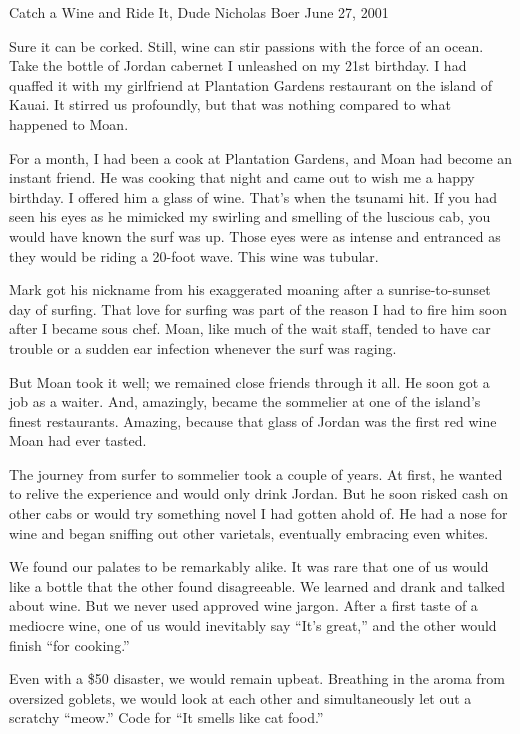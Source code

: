 \documentclass[12pt]{article}
\begin{document}
Catch a Wine and Ride It, Dude\newline
Nicholas Boer\newline
June 27, 2001

\bigskip
Sure it can be corked.
Still, wine can stir passions with the force of an ocean.
Take the bottle of Jordan cabernet I unleashed on my 21st birthday.
I had quaffed it with my girlfriend at Plantation Gardens restaurant on the island of Kauai.
It stirred us profoundly, but that was nothing compared to what happened to Moan.

\bigskip
For a month, I had been a cook at Plantation Gardens, and Moan had become an instant friend.
He was cooking that night and came out to wish me a happy birthday.
I offered him a glass of wine.
That's when the tsunami hit.
If you had seen his eyes as he mimicked my swirling and smelling of the luscious cab, you would have known the surf was up.
Those eyes were as intense and entranced as they would be riding a 20-foot wave.
This wine was tubular.

\bigskip
Mark got his nickname from his exaggerated moaning after a sunrise-to-sunset day of surfing.
That love for surfing was part of the reason I had to fire him soon after I became sous chef.
Moan, like much of the wait staff, tended to have car trouble or a sudden ear infection whenever the surf was raging.

\bigskip
But Moan took it well; we remained close friends through it all.
He soon got a job as a waiter.
And, amazingly, became the sommelier at one of the island's finest restaurants.
Amazing, because that glass of Jordan was the first red wine Moan had ever tasted.

\bigskip
The journey from surfer to sommelier took a couple of years.
At first, he wanted to relive the experience and would only drink Jordan.
But he soon risked cash on other cabs or would try something novel I had gotten ahold of.
He had a nose for wine and began sniffing out other varietals, eventually embracing even whites.

\bigskip
We found our palates to be remarkably alike.
It was rare that one of us would like a bottle that the other found disagreeable.
We learned and drank and talked about wine.
But we never used approved wine jargon.
After a first taste of a mediocre wine, one of us would inevitably say ``It's great,'' and the other would finish ``for cooking.''

\bigskip
Even with a \$50 disaster, we would remain upbeat.
Breathing in the aroma from oversized goblets, we would look at each other and simultaneously let out a scratchy ``meow.''
Code for ``It smells like cat food.''
\end{document}
